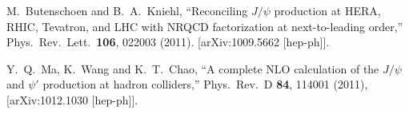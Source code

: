 \documentclass[aps,prc,preprint,superscriptaddress,showpacs,showkeys,amsmath]{revtex4-1}
\begin{document}
\begin{thebibliography}{100}
  M.~Butenschoen and B.~A.~Kniehl,
  ``Reconciling $J/\psi$ production at HERA, RHIC, Tevatron, and LHC with NRQCD factorization at next-to-leading order,''
  Phys.\ Rev.\ Lett.\  {\bf 106}, 022003 (2011). 
[arXiv:1009.5662 [hep-ph]].
 

  Y.~Q.~Ma, K.~Wang and K.~T.~Chao,
  ``A complete NLO calculation of the $J/\psi$ and $\psi'$ production at hadron colliders,''
  Phys.\ Rev.\ D {\bf 84}, 114001 (2011),
  [arXiv:1012.1030 [hep-ph]].








\end{thebibliography}
\end{document}
